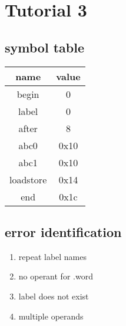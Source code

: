 \documentclass[11pt]{amsart}
\begin{document}
\section{Tutorial 3}
\subsection{symbol table}
\begin{tabular}{|c c|}
  \hline
  name & value \\
  \hline
  begin & 0\\
  label & 0\\
  after & 8\\
  abc0 & 0x10\\
  abc1 & 0x10\\
  loadstore &0x14\\
  end & 0x1c\\
  \hline
\end{tabular}
\subsection{error identification}
\begin{enumerate}
  \item repeat label names
  \item no operant for .word
  \item label does not exist
  \item multiple operands
\end{enumerate}
\end{document}
